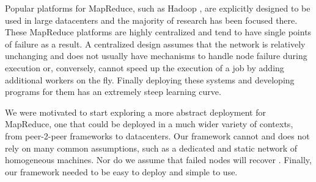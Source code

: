 Popular platforms for MapReduce, such as Hadoop \cite{Hadoop}, are explicitly designed to be used in large datacenters \cite{hadoopAssumptions} and the majority of research has been focused there.  
These MapReduce platforms are highly centralized and tend to have single points of failure\cite{shvachko2010hadoop} as a result.   A centralized design assumes that the network is relatively unchanging and does not usually have mechanisms to handle node failure during execution or, conversely, cannot speed up the execution of a job by adding additional workers on the fly.  Finally deploying these systems and developing programs for them has an extremely steep learning curve.


We were motivated to start exploring a more abstract deployment for MapReduce, one that could be deployed in a much wider variety of contexts, from peer-2-peer frameworks to datacenters.  Our framework cannot and does not rely on many common assumptions, such as a dedicated and static network of homogeneous machines. Nor do we assume that failed nodes will recover \cite{hadoopAssumptions}.  Finally, our framework needed to be easy to deploy and simple to use.    

